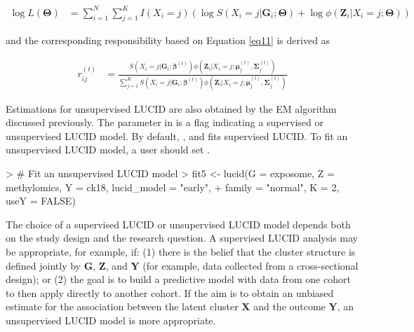 \begin{equation}
    \begin{aligned}
         \log L(\bm{\Theta}) & = \sum_{i = 1}^N \sum_{j=1}^K I(X_i = j) \left( \log S(X_i = j| \bm{G}_i; \bm{\Theta}) + \log \phi(\bm{Z}_i| X_i = j; \bm{\Theta})\right)
    \end{aligned}
    \label{eq11}
\end{equation}

and the corresponding responsibility based on Equation \ref{eq11} is derived as

\begin{equation}
    \begin{aligned}
        r_{ij}^{(t)} & = \frac{S\left(X_i = j| \bm{G}_i; \bm{\beta}^{(t)}\right) \phi\left(\bm{Z}_i| X_i = j; \bm{\mu}_j^{(t)}, \bm{\Sigma}_j^{(t)}\right)}{\sum_{j = 1}^K S\left(X_i = j| \bm{G}_i; \bm{\beta}^{(t)}\right) \phi\left(\bm{Z}_i| X_i = j; \bm{\mu}_j^{(t)}, \bm{\Sigma}_j^{(t)}\right)}
    \end{aligned}
    \label{eq12}
\end{equation}

Estimations for unsupervised LUCID are also obtained by the EM algorithm discussed previously. The parameter  in  is a flag indicating a supervised or unsupervised LUCID model. By default, , and  fits supervised LUCID. To fit an unsupervised LUCID model, a user should set .

\begin{example}
> # Fit an unsupervised LUCID model
> fit5 <- lucid(G = exposome, Z = methylomics, Y = ck18, lucid_model = "early", 
+               family = "normal", K = 2, useY = FALSE)
\end{example}

The choice of a supervised LUCID or unsupervised LUCID model depends both on the study design and the research question. A supervised LUCID analysis may be appropriate, for example, if: (1) there is the belief that the cluster structure is defined jointly by $\bm G$, $\bm Z$, and $\bm Y$ (for example, data collected from a cross-sectional design); or (2) the goal is to build a predictive model with data from one cohort to then apply directly to another cohort. If the aim is to obtain an unbiased estimate for the association between the latent cluster $\bm X$ and the outcome $\bm Y$, an unsupervised LUCID model is more appropriate.


